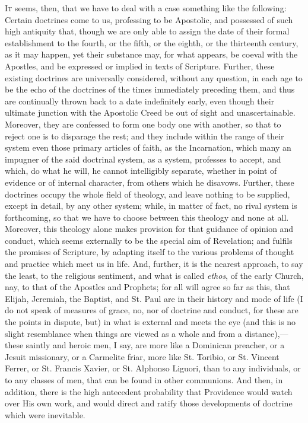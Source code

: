 I\textsc{t} seems, then, that we have to deal with a case
something like the following: Certain doctrines come to
us, professing to be Apostolic, and possessed of such
high antiquity that, though we are only able to assign
the date of their formal establishment to the fourth, or
the fifth, or the eighth, or the thirteenth century, as
it may happen, yet their substance may, for what appears,
be coeval with the Apostles, and be expressed or implied
in texts of Scripture. Further, these existing doctrines
are universally considered, without any question, in each
age to be the echo of the doctrines of the times
immediately preceding them, and thus are continually
thrown back to a date indefinitely early, even though
their ultimate junction with the Apostolic Creed be out
of sight and unascertainable. Moreover, they are
confessed to form one body one with another, so that to
reject one is to disparage the rest; and they include
within the range of their system even those primary
articles of faith, as the Incarnation, which many an
impugner of the said doctrinal system, as a system,
professes to accept, and which, do what he will, he
cannot intelligibly separate, whether in point of
evidence or of internal character, from others which he
disavows. Further, these doctrines occupy the whole field
of theology, and leave nothing to be supplied, except in
detail, by any other system; while, in matter of fact, no
rival system is forthcoming, so that we have to choose
between this theology and none at all. Moreover, this
theology alone makes provision for that guidance of
opinion and conduct, which seems externally to be the
special aim of Revelation; and fulfils the promises of
Scripture, by adapting itself to the various problems of
thought and practice which meet us in life. And, further,
it is the nearest approach, to say the least, to the
religious sentiment, and what is called \emph{ethos}, of
the early Church, nay, to that of the Apostles and
Prophets; for all will agree so far as this, that Elijah,
Jeremiah, the Baptist, and St. Paul are in their history
and mode of life (I do not speak of measures of grace,
no, nor of doctrine and conduct, for these are the points
in dispute, but) in what is external and meets the eye
(and this is no slight resemblance when things are viewed
as a whole and from a distance),—these saintly and
heroic men, I say, are more like a Dominican preacher, or
a Jesuit missionary, or a Carmelite friar, more like St.
Toribio, or St. Vincent Ferrer, or St. Francis Xavier, or
St. Alphonso Liguori, than to any individuals, or to any
classes of men, that can be found in other communions.
And then, in addition, there is the high antecedent
probability that Providence would watch over His own
work, and would direct and ratify those developments of
doctrine which were inevitable.

